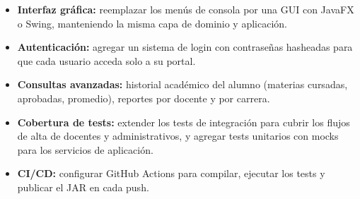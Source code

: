 \documentclass[12pt,a4paper]{article}
\begin{document}
\begin{itemize}
    \item \textbf{Interfaz gráfica:} reemplazar los menús de consola por
        una GUI con JavaFX o Swing, manteniendo la misma capa de dominio y
        aplicación.
    \item \textbf{Autenticación:} agregar un sistema de login con
        contraseñas hasheadas para que cada usuario acceda solo a su
        portal.
    \item \textbf{Consultas avanzadas:} historial académico del alumno
        (materias cursadas, aprobadas, promedio), reportes por docente y
        por carrera.
    \item \textbf{Cobertura de tests:} extender los tests de integración
        para cubrir los flujos de alta de docentes y administrativos, y
        agregar tests unitarios con mocks para los servicios de aplicación.
    \item \textbf{CI/CD:} configurar GitHub Actions para compilar, ejecutar
        los tests y publicar el JAR en cada push.
\end{itemize}
\end{document}
